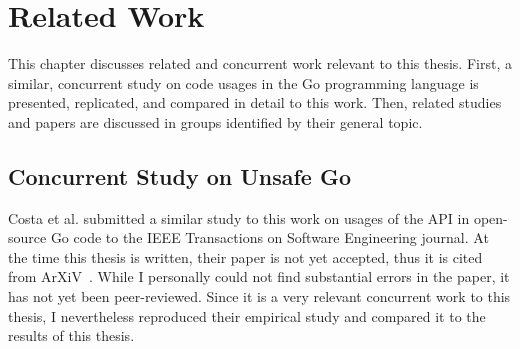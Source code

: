 
\chapter{Related Work}\label{ch:related-work}

This chapter discusses related and concurrent work relevant to this thesis.
First, a similar, concurrent study on \unsafe{} code usages in the Go programming language is presented, replicated, and
compared in detail to this work.
Then, related studies and papers are discussed in groups identified by their general topic.



\section{Concurrent Study on Unsafe Go}\label{sec:related-work:concurrent-study}

Costa et al. submitted a similar study to this work on usages of the \unsafe{} \acrshort{API} in open-source Go code to
the IEEE Transactions on Software Engineering journal.
At the time this thesis is written, their paper is not yet accepted, thus it is cited from ArXiV~\cite{costa2020}.
While I personally could not find substantial errors in the paper, it has not yet been peer-reviewed.
Since it is a very relevant concurrent work to this thesis, I nevertheless reproduced their empirical study and compared
it to the results of this thesis.

